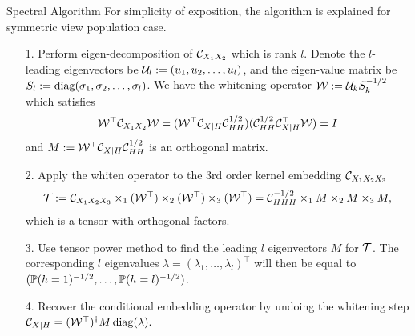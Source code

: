 \documentclass[final,t]{beamer}
\begin{document}
\begin{frame}{}
\begin{columns}[t]
\begin{column}{.3\linewidth}
     \begin{block}{Spectral Algorithm}
          For simplicity of exposition, the algorithm is explained for \alert{symmetric} view population case.
          \begin{itemize}
          \item[1.] Perform eigen-decomposition of $\mathcal{C}_{X_1 X_2}$ which is rank $l$. Denote the $l$-leading eigenvectors be  $\mathcal{U}_l:=(u_1,u_2,\ldots,u_l)$, and the eigen-value matrix be $S_l:=\mathop{\mathrm{diag}}(\sigma_1,\sigma_2,\ldots,\sigma_l)$. We have the whitening operator $\mathcal{W}:= \mathcal{U}_k S_k^{-1/2}$ which satisfies
          \begin{align*}
            \mathcal{W}^\top \mathcal{C}_{X_1X_2} \mathcal{W} = (\mathcal{W}^\top \mathcal{C}_{X|H} \mathcal{C}_{HH}^{1/2}) (\mathcal{C}_{HH}^{1/2} \mathcal{C}_{X|H}^\top \mathcal{W}) = I
          \end{align*}
          and $M:=\mathcal{W}^\top \mathcal{C}_{X|H} \mathcal{C}_{HH}^{1/2}$ is an orthogonal matrix.
          \item[2.] Apply the whiten operator to the 3rd order kernel embedding $\mathcal{C}_{X_1 X_2 X_3}$
          \begin{eqnarray*}
            {\mathcal{T}} := \mathcal{C}_{X_1 X_2 X_3} \times_1 (\mathcal{W}^\top) \times_2 (\mathcal{W}^\top) \times_3 (\mathcal{W}^\top)
            = \mathcal{C}_{HHH}^{-1/2} \times_1 M \times_2 M \times_3 M,
          \end{eqnarray*}
          which is a tensor with orthogonal factors.
          \item[3.] Use tensor power method to find the leading $l$ eigenvectors $M$ for ${\mathcal{T}}$. The corresponding $l$ eigenvalues $\lambda = (\lambda_1,\ldots,\lambda_l)^\top$ will then be equal to $(\mathbb{P}(h=1)^{-1/2},\ldots,\mathbb{P}(h=l)^{-1/2})$.
          \item[4.] Recover the conditional embedding operator by undoing the whitening step
          $
            \mathcal{C}_{X|H} = (\mathcal{W}^\top)^\dagger M \mathop{\mathrm{diag}}(\lambda).
          $
          \end{itemize}
      \vspace{-0.4in}
     \end{block}



\end{column}
\end{columns}
\end{frame}
\end{document}
